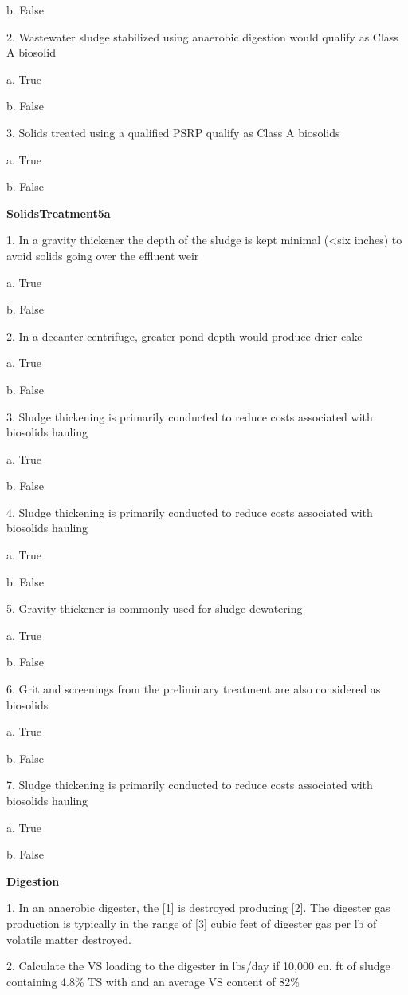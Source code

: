 \documentclass{article}
\begin{document}
b. False 


2. Wastewater sludge stabilized using anaerobic digestion would qualify as Class A biosolid 

a. True 

b. False 


3. Solids treated using a qualified PSRP qualify as Class A biosolids 

a. True 

b. False 


\textbf{SolidsTreatment5a}

1. In a gravity thickener the depth of the sludge is kept minimal (<six inches) to avoid solids going over the effluent weir 

a. True 

b. False 


2. In a decanter centrifuge, greater pond depth would produce drier cake 

a. True 

b. False 


3. Sludge thickening is primarily conducted to reduce costs associated with biosolids hauling

a. True 

b. False 


4. Sludge thickening is primarily conducted to reduce costs associated with biosolids hauling 

a. True 

b. False 


5. Gravity thickener is commonly used for sludge dewatering 

a. True 

b. False 


6. Grit and screenings from the preliminary treatment are also considered as biosolids 

a. True 

b. False 


7. Sludge thickening is primarily conducted to reduce costs associated with biosolids hauling 

a. True 

b. False 


\textbf{Digestion}

1. In an anaerobic digester, the [1] is destroyed producing [2]. The digester gas production is typically in the range of [3] cubic feet of digester gas per lb of volatile matter destroyed. 


2. Calculate the VS loading to the digester in lbs/day if 10,000 cu. ft of sludge containing 4.8\% TS with and an average VS content of 82\% 
\end{document}
